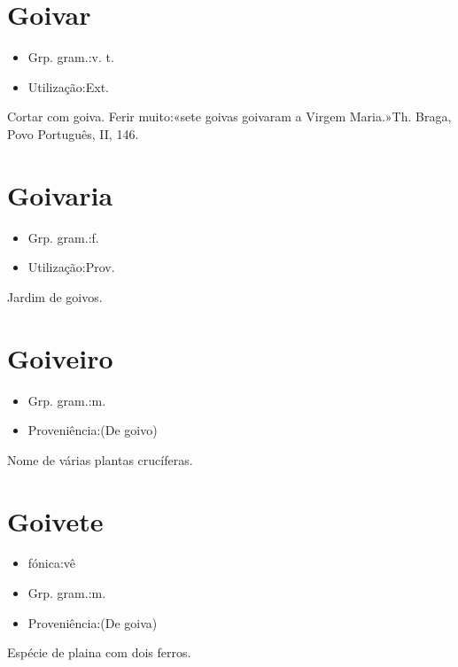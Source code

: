 \section{Goivar}
\begin{itemize}
\item {Grp. gram.:v. t.}
\end{itemize}
\begin{itemize}
\item {Utilização:Ext.}
\end{itemize}
Cortar com goiva.
Ferir muito:«\textunderscore sete goivas goivaram a Virgem Maria.\textunderscore »Th. Braga, \textunderscore Povo Português\textunderscore , II, 146.
\section{Goivaria}
\begin{itemize}
\item {Grp. gram.:f.}
\end{itemize}
\begin{itemize}
\item {Utilização:Prov.}
\end{itemize}
Jardim de goivos.
\section{Goiveiro}
\begin{itemize}
\item {Grp. gram.:m.}
\end{itemize}
\begin{itemize}
\item {Proveniência:(De \textunderscore goivo\textunderscore )}
\end{itemize}
Nome de várias plantas crucíferas.
\section{Goivete}
\begin{itemize}
\item {fónica:vê}
\end{itemize}
\begin{itemize}
\item {Grp. gram.:m.}
\end{itemize}
\begin{itemize}
\item {Proveniência:(De \textunderscore goiva\textunderscore )}
\end{itemize}
Espécie de plaina com dois ferros.
